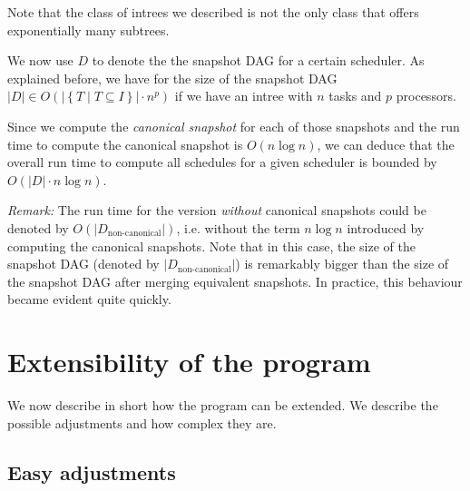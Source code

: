 Note that the class of intrees we described is not the only class that offers exponentially many subtrees.

We now use $D$ to denote the the snapshot DAG for a certain scheduler. As explained before, we have for the size of the snapshot DAG $|D|\in O\left(|\left\{ T \mid T\subseteq I \right\}|\cdot n^p\right)$ if we have an intree with $n$ tasks and $p$ processors.

Since we compute the \emph{canonical snapshot} for each of those snapshots and the run time to compute the canonical snapshot is $O(n \log n)$, we can deduce that the overall run time to compute all schedules for a given scheduler is bounded by $O(|D| \cdot n \log n)$.

\emph{Remark:} The run time for the version \emph{without} canonical snapshots could be denoted by $O(|D_{\text{non-canonical}}|)$, i.e. without the term $n\log n$ introduced by computing the canonical snapshots. Note that in this case, the size of the snapshot DAG (denoted by $|D_{\text{non-canonical}}|$) is remarkably bigger than the size of the snapshot DAG after merging equivalent snapshots. In practice, this behaviour became evident quite quickly.

\section{Extensibility of the program}
\label{sec:implementation-extending-program}

We now describe in short how the program can be extended. We describe the possible adjustments and how complex they are.

\subsection{Easy adjustments}
\label{sec:implementation-extensions-easy}


